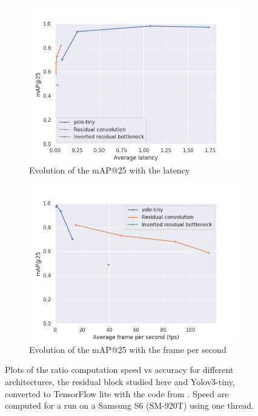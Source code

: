 \begin{figure}
\begin{center}
\begin{subfigure}[t]{.49\linewidth}
      \centering
      \includegraphics[width=0.99\linewidth]{figures/map_at_25_latency_models.png}
      \caption{Evolution of the mAP@25 with the latency}
    \end{subfigure}
    \begin{subfigure}[t]{.49\linewidth}
      \centering
      \includegraphics[width=0.99\linewidth]{figures/map_at_25_fps_models.png}
      \caption{Evolution of the mAP@25 with the frame per second}
    \end{subfigure}
    \caption{Plots of the ratio computation speed vs accuracy for different architectures, the residual block studied here and Yolov3-tiny, converted to TensorFlow lite with the code from \cite{benjamintanweihao2018Oct}. Speed are computed for a run on a Samsung S6 (SM-920T) using one thread.}
    \label{fig:map_to_speed}
  \end{center}
\end{figure}

